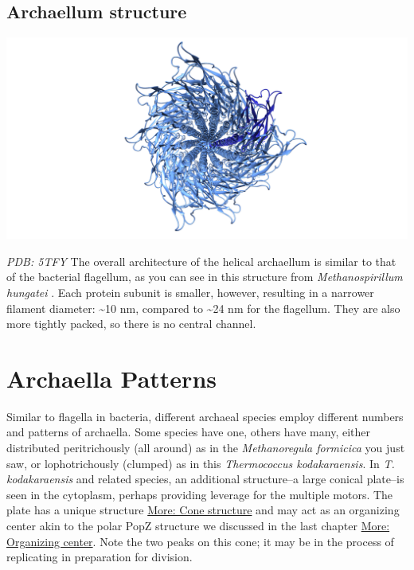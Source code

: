 \documentclass[]{tufte-book}
\begin{document}
\subsection{Archaellum structure}\label{Archaellum_structure}

\includegraphics{img/schematics/6_8_1}

\emph{PDB: 5TFY} The overall architecture of the helical archaellum is
similar to that of the bacterial flagellum, as you can see in this
structure from \emph{Methanospirillum hungatei} \citep{poweleit2016}.
Each protein subunit is smaller, however, resulting in a narrower
filament diameter: \textasciitilde{}10 nm, compared to
\textasciitilde{}24 nm for the flagellum. They are also more tightly
packed, so there is no central channel.

\section{Archaella Patterns}\label{archaella-patterns}

Similar to flagella in bacteria, different archaeal species employ
different numbers and patterns of archaella. Some species have one,
others have many, either distributed peritrichously (all around) as in
the \emph{Methanoregula formicica} you just saw, or lophotrichously
(clumped) as in this \emph{Thermococcus kodakaraensis}. In \emph{T.
kodakaraensis} and related species, an additional structure--a large
conical plate--is seen in the cytoplasm, perhaps providing leverage for
the multiple motors. The plate has a unique structure
\protect\hyperlink{Cone_structure}{More: Cone structure} and may act as
an organizing center akin to the polar PopZ structure we discussed in
the last chapter \protect\hyperlink{Organizing_center}{More: Organizing
center}. Note the two peaks on this cone; it may be in the process of
replicating in preparation for division.
\end{document}

